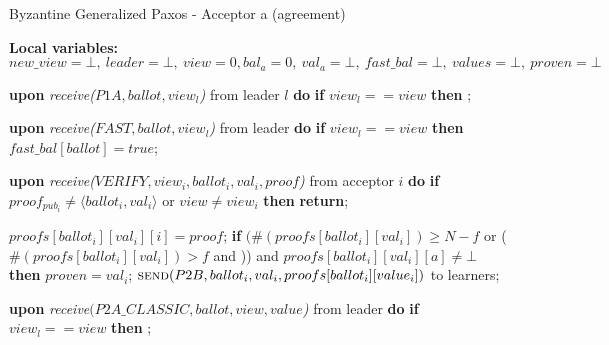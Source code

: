 \begin{algorithm} 
	\caption{Byzantine Generalized Paxos - Acceptor a (agreement)}
	\label{BFT-Acc}
	\textbf{Local variables:} $new\_view = \bot,\ leader = \bot,\ view = 0, bal_a = 0,\ val_a = \bot,\ fast\_bal = \bot,\ values=\bot,\ proven = \bot$
	\begin{algorithmic}[1]
		\State \textbf{upon} \textit{receive($P1A, ballot, view_l$)} from leader $l$ \textbf{do}
		\State \hspace{\algorithmicindent} \textbf{if} $view_l == view$ \textbf{then}
		\State \hspace{\algorithmicindent}\hspace{\algorithmicindent} ;
		
		\State
		\State \textbf{upon} \textit{receive($FAST,ballot,view_l$)} from leader \textbf{do}
		\State \hspace{\algorithmicindent} \textbf{if} $view_l == view$ \textbf{then}
		\State \hspace{\algorithmicindent}\hspace{\algorithmicindent} $fast\_bal[ballot] = true$;

		\State
		\State \textbf{upon} \textit{receive($VERIFY,view_i, ballot_i,val_i,proof$)} from acceptor $i$ \textbf{do}
		\State \hspace{\algorithmicindent} \textbf{if} $proof_{pub_i} \neq \langle ballot_i, val_i \rangle$ or $view \neq view_i$ \textbf{then}
		\State \hspace{\algorithmicindent}\hspace{\algorithmicindent} \textbf{return};
		\State
		
		\State \hspace{\algorithmicindent} $proofs[ballot_i][val_i][i] = proof$;
		\State \hspace{\algorithmicindent} \textbf{if} $(\#(proofs[ballot_i][val_i]) \geq N-f$ or ($\#(proofs[ballot_i][val_i]) > f$ and )) and $proofs[ballot_i][val_i][a] \neq \bot$ \textbf{then}
		\State \hspace{\algorithmicindent}\hspace{\algorithmicindent} $proven = val_i$;
		\State \hspace{\algorithmicindent}\hspace{\algorithmicindent} $\Call{send}{P2B, ballot_i, val_i, proofs[ballot_i][value_i]}$ to learners;
		
		\State
		\State \textbf{upon} \textit{receive$(P2A\_CLASSIC, ballot, view, value$)} from leader \textbf{do}
		\State \hspace{\algorithmicindent} \textbf{if} $view_l == view$ \textbf{then}
		\State \hspace{\algorithmicindent}\hspace{\algorithmicindent} ; 
		

\end{algorithmic}
\end{algorithm}
